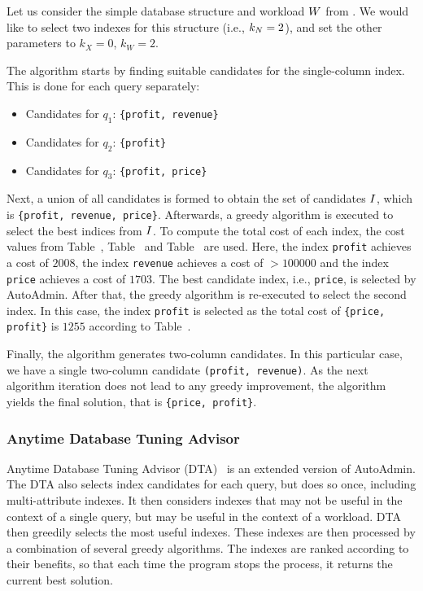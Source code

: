 \begin{example}
Let us consider the simple database structure and workload $W$ from . We would like to select two indexes for this structure (i.e., $k_N = 2$), and set the other parameters to $k_X = 0$, $k_W = 2$.

The algorithm starts by finding suitable candidates for the single-column index. This is done for each query separately: 
\begin{itemize}
    \item Candidates for $q_1$: \texttt{\{profit, revenue\}}
    \item Candidates for $q_2$: \texttt{\{profit\}}
    \item Candidates for $q_3$: \texttt{\{profit, price\}}
\end{itemize}

Next, a union of all candidates is formed to obtain the set of candidates $I$, which is \texttt{\{profit, revenue, price\}}. Afterwards, a greedy algorithm is executed to select the best indices from $I$. To compute the total cost of each index, the cost values from Table~, Table~ and Table~ are used. Here, the index \texttt{profit} achieves a cost of $2008$, the index \texttt{revenue} achieves a cost of $>100000$ and the index \texttt{price} achieves a cost of $1703$. The best candidate index, i.e., \texttt{price}, is selected by AutoAdmin. After that, the greedy algorithm is re-executed to select the second index. In this case, the index \texttt{profit} is selected as the total cost of \texttt{\{price, profit\}} is $1255$ according to Table~.

Finally, the algorithm generates two-column candidates. In this particular case, we have a single two-column candidate \texttt{(profit, revenue)}. As the next algorithm iteration does not lead to any greedy improvement, the algorithm yields the final solution, that is \texttt{\{price, profit\}}.
\end{example}

\subsubsection{Anytime Database Tuning Advisor}
Anytime Database Tuning Advisor (DTA)~\citep{Anytime20} is an extended version of AutoAdmin. The DTA also selects index candidates for each query, but does so once, including multi-attribute indexes. It then considers indexes that may not be useful in the context of a single query, but may be useful in the context of a workload. DTA then greedily selects the most useful indexes. These indexes are then processed by a combination of several greedy algorithms. The indexes are ranked according to their benefits, so that each time the program stops the process, it returns the current best solution.

